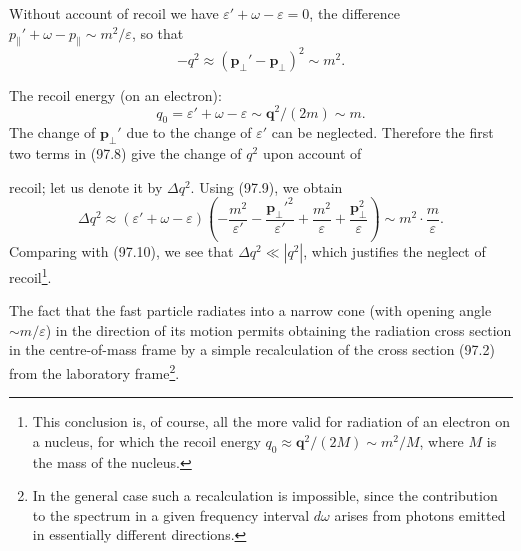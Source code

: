 Without account of recoil we have $\varepsilon' + \omega - \varepsilon = 0$, the difference $p_\parallel' + \omega - p_\parallel \sim m^2/\varepsilon$, so that
\begin{equation}
-q^2 \approx (\mathbf{p}_\perp' - \mathbf{p}_\perp)^2 \sim m^2.
\label{eq:97.10}
\end{equation}

The recoil energy (on an electron):
\begin{equation}
q_0 = \varepsilon' + \omega - \varepsilon \sim \mathbf{q}^2/(2m) \sim m.
\label{eq:97.11}
\end{equation}
The change of $\mathbf{p}_\perp'$ due to the change of $\varepsilon'$ can be neglected. Therefore the first two terms in (97.8) give the change of $q^2$ upon account of


recoil; let us denote it by $\Delta q^2$. Using (97.9), we obtain
\[
\Delta q^2 \approx (\varepsilon' + \omega - \varepsilon)\!\left(-\frac{m^2}{\varepsilon'} - \frac{\mathbf{p}_\perp'^2}{\varepsilon'} + \frac{m^2}{\varepsilon} + \frac{\mathbf{p}_\perp^2}{\varepsilon}\right) \sim m^2\cdot\frac{m}{\varepsilon}.
\]
Comparing with (97.10), we see that $\Delta q^2 \ll |q^2|$, which justifies the neglect of recoil\footnote{This conclusion is, of course, all the more valid for radiation of an electron on a nucleus, for which the recoil energy $q_0 \approx \mathbf{q}^2/(2M) \sim m^2/M$, where $M$ is the mass of the nucleus.}.

The fact that the fast particle radiates into a narrow cone (with opening angle $\sim m/\varepsilon$) in the direction of its motion permits obtaining the radiation cross section in the centre-of-mass frame by a simple recalculation of the cross section (97.2) from the laboratory frame\footnote{In the general case such a recalculation is impossible, since the contribution to the spectrum in a given frequency interval $d\omega$ arises from photons emitted in essentially different directions.}.

